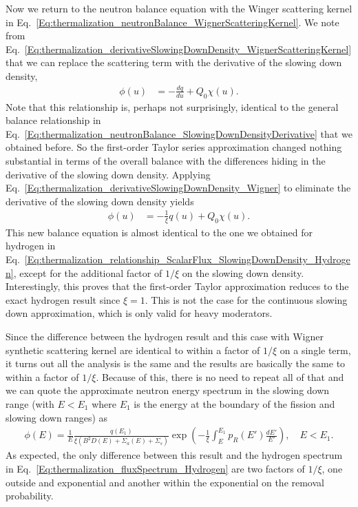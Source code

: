 Now we return to the neutron balance equation with the Winger scattering kernel in Eq.~\eqref{Eq:thermalization_neutronBalance_WignerScatteringKernel}. We note from Eq.~\eqref{Eq:thermalization_derivativeSlowingDownDensity_WignerScatteringKernel} that we can replace the scattering term with the derivative of the slowing down density,
\begin{align}
  [ B^2 D(u) + \Sigma_a(u) ] \phi(u) &= -\frac{dq}{du} + Q_0 \chi(u). 
\end{align}
Note that this relationship is, perhaps not surprisingly, identical to the general balance relationship in Eq.~\eqref{Eq:thermalization_neutronBalance_SlowingDownDensityDerivative} that we obtained before. So the first-order Taylor series approximation changed nothing substantial in terms of the overall balance with the differences hiding in the derivative of the slowing down density. Applying Eq.~\eqref{Eq:thermalization_derivativeSlowingDownDensity_Wigner} to eliminate the derivative of the slowing down density yields
\begin{align}
  [ B^2 D(u) + \Sigma_a(u) + \Sigma_s ] \phi(u) &= -\frac{1}{\xi} q(u) + Q_0 \chi(u). 
\end{align}
This new balance equation is almost identical to the one we obtained for hydrogen in Eq.~\eqref{Eq:thermalization_relationship_ScalarFlux_SlowingDownDensity_Hydrogen}, except for the additional factor of $1/\xi$ on the slowing down density. Interestingly, this proves that the first-order Taylor approximation reduces to the exact hydrogen result since $\xi = 1$. This is not the case for the continuous slowing down approximation, which is only valid for heavy moderators.

Since the difference between the hydrogen result and this case with Wigner synthetic scattering kernel are identical to within a factor of $1/\xi$ on a single term, it turns out all the analysis is the same and the results are basically the same to within a factor of $1/\xi$. Because of this, there is no need to repeat all of that and we can quote the approximate neutron energy spectrum in the slowing down range (with $E < E_1$ where $E_1$ is the energy at the boundary of the fission and slowing down ranges) as
\begin{align}
  \phi(E) = \frac{1}{E} \frac{ q(E_1) }{ \xi ( B^2 D(E) + \Sigma_a(E) + \Sigma_s )} \exp\left( -\frac{1}{\xi} \int_E^{E_1} p_R(E') \frac{dE'}{E'}  \right) , \quad E < E_1 . \label{Eq:thermalization_fluxSpectrum_Wigner}
\end{align}
As expected, the only difference between this result and the hydrogen spectrum in Eq.~\eqref{Eq:thermalization_fluxSpectrum_Hydrogen} are two factors of $1/\xi$, one outside and exponential and another within the exponential on the removal probability.

